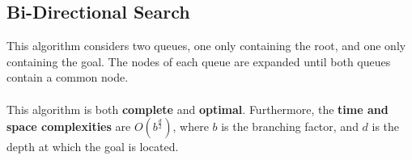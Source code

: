 \documentclass{article}
\begin{document}
\subsection{Bi-Directional Search}
This algorithm considers two queues, one only containing the root, and one only containing the goal. The nodes of each queue are expanded until both queues contain a common node. \\ \\
This algorithm is both \textbf{complete} and \textbf{optimal}. Furthermore, the \textbf{time and space complexities} are $O(b ^{\frac{d}{2}})$, where $b$ is the branching factor, and $d$ is the depth at which the goal is located.
\end{document}
